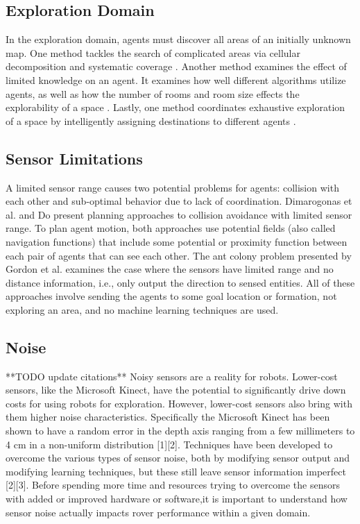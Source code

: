 \documentclass[letterpaper, 10 pt, conference]{ieeeconf}  %
\begin{document}
\subsection{Exploration Domain}
In the exploration domain, agents must discover all areas of an
initially unknown map. One method tackles the search of complicated
areas via cellular decomposition and systematic coverage \cite{choset2001coverage}. Another
method examines the effect of limited knowledge on an agent. It
examines how well different algorithms utilize agents, as well as how
the number of rooms and room size effects the explorability of a space
\cite{ferranti2007brick}. Lastly, one method coordinates exhaustive exploration of a space
by intelligently assigning destinations to different agents \cite{burgard2005coordinated}.

\subsection{Sensor Limitations}
A limited sensor range causes two potential problems for agents:
collision with each other and sub-optimal behavior due to lack of
coordination. Dimarogonas et al. \cite{dimarogonas2007decentralized} and Do \cite{do2007bounded} present planning
approaches to collision avoidance with limited sensor range. To plan
agent motion, both approaches use potential fields (also called
navigation functions) that include some potential or proximity
function between each pair of agents that can see each other. The ant
colony problem presented by Gordon et al. \cite{gordon2004gathering} examines the case where
the sensors have limited range and no distance information, i.e., only
output the direction to sensed entities. All of these approaches
involve sending the agents to some goal location or formation, not
exploring an area, and no machine learning techniques are used.

\subsection{Noise}
**TODO update citations**
Noisy sensors are a reality for robots. Lower-cost sensors, like the Microsoft Kinect, have the potential to significantly drive down costs for using robots for exploration. However, lower-cost sensors also bring with them higher noise characteristics. Specifically the Microsoft Kinect has been shown to have a random error in the depth axis ranging from a few millimeters to 4 cm in a non-uniform distribution \cite{blah} [1][2]. Techniques have been developed to overcome the various types of sensor noise, both by modifying sensor output and modifying learning techniques, but these still leave sensor information imperfect \cite{blah} [2][3]. Before spending more time and resources trying to overcome the sensors with added or improved hardware or software,it is important to understand how sensor noise actually impacts rover performance within a given domain.
\end{document}
